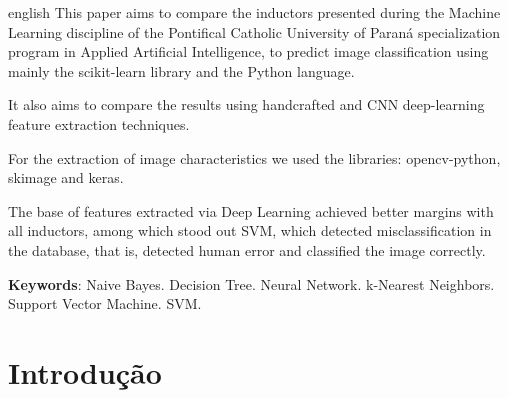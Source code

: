 \documentclass[
article,			%
11pt,				%
oneside,			%
a4paper,			%
english,			%
brazil,				%
sumario=tradicional,
]{abntex2}
\begin{document}
	
	\renewcommand{\resumoname}{Abstract}
	\begin{resumoumacoluna}
		\begin{otherlanguage*}{english}
			This paper aims to compare the inductors presented during the Machine Learning discipline of the Pontifical Catholic University of Paraná specialization program in Applied Artificial Intelligence, to predict image classification using mainly the scikit-learn library and the Python language.
			
			It also aims to compare the results using handcrafted and CNN deep-learning feature extraction techniques.
			
			For the extraction of image characteristics we used the libraries: opencv-python, skimage and keras.
			
			The base of features extracted via Deep Learning achieved better margins with all inductors, among which stood out SVM, which detected misclassification in the database, that is, detected human error and classified the image correctly.
			
			\vspace{\onelineskip}
			
			\noindent
			\textbf{Keywords}: Naive Bayes. Decision Tree. Neural Network. k-Nearest Neighbors. Support Vector Machine. SVM.
		\end{otherlanguage*}  
	\end{resumoumacoluna}
	
	
	
		
	
	\textual
	
	\section{Introdução}
	
\end{document}
